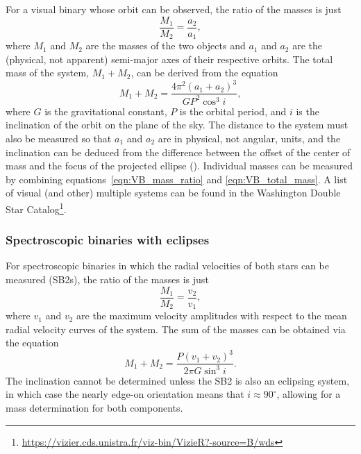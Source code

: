 \documentclass[twocolumn,tighten,twocolappendix]{aastex631}
\begin{document}
For a visual binary whose orbit can be observed, the ratio of the masses is just
\begin{equation}
\label{eqn:VB_mass_ratio}
   \frac{M_1}{M_2} = \frac{a_2}{a_1},
\end{equation}
where $M_1$ and $M_2$ are the masses of the two objects and $a_1$ and $a_2$ are the (physical, not apparent) semi-major axes of their respective orbits. The total mass of the system, $M_1 + M_2$, can be derived from the equation
\begin{equation}
\label{eqn:VB_total_mass}
   M_1 + M_2 = \frac{4\pi^2(a_1 + a_2)^3}{GP^2{\cos^3{i}}},
\end{equation}
where $G$ is the gravitational constant, $P$ is the orbital period, and $i$ is the inclination of the orbit on the plane of the sky. The distance to the system must also be measured so that $a_1$ and $a_2$ are in physical, not angular, units, and the inclination can be deduced from the difference between the offset of the center of mass and the focus of the projected ellipse (\citealt{carroll1996}). Individual masses can be measured by combining equations~\ref{eqn:VB_mass_ratio} and \ref{eqn:VB_total_mass}. A list of visual (and other) multiple systems can be found in the Washington Double Star Catalog\footnote{\url{https://vizier.cds.unistra.fr/viz-bin/VizieR?-source=B/wds}}.

\subsubsection{Spectroscopic binaries with eclipses}

For spectroscopic binaries in which the radial velocities of both stars can be measured (SB2s), the ratio of the masses is just
\begin{equation}
    \frac{M_1}{M_2} = \frac{v_2}{v_1},
\end{equation}
where $v_1$ and $v_2$ are the maximum velocity amplitudes with respect to the mean radial velocity curves of the system. The sum of the masses can be obtained via the equation
\begin{equation}
    M_1 + M_2 = \frac{P(v_1 + v_2)^3}{2{\pi}G\sin^3{i}}.
\end{equation}
The inclination cannot be determined unless the SB2 is also an eclipsing system, in which case the nearly edge-on orientation means that $i \approx 90^\circ$, allowing for a mass determination for both components.
\end{document}
